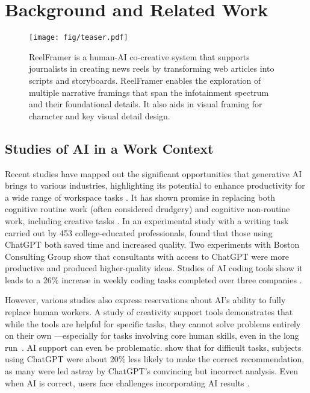 \section{Background and Related Work}

\begin{figure*}
\centering
\texttt{[image: fig/teaser.pdf]}
\caption{
ReelFramer is a human-AI co-creative system that supports journalists in creating news reels by transforming web articles into scripts and storyboards.
ReelFramer enables the exploration of multiple narrative framings that span the infotainment spectrum and their foundational details. 
It also aids in visual framing for character and key visual detail design.
}
\label{fig:teaser}
\end{figure*}

\subsection{Studies of AI in a Work Context}

Recent studies have mapped out the significant opportunities that generative AI brings to various industries, highlighting its potential to enhance productivity for a wide range of workspace tasks \cite{brynjolfsson2023generative, scienceproductivity}. 
It has shown promise in replacing both cognitive routine work (often considered drudgery) and cognitive non-routine work, including creative tasks \cite{bouschery2023augmenting}.
In an experimental study with a writing task carried out by 453 college-educated professionals, \citet{scienceproductivity} found that those using ChatGPT both saved time and increased quality.
Two experiments with Boston Consulting Group \cite{dell2023navigating} show that consultants with access to ChatGPT were more productive and produced higher-quality ideas.
Studies of AI coding tools show it leads to a 26\% increase in weekly coding tasks completed over three companies \cite{Cui_2024, peng2023impact}.

However, various studies also express reservations about AI's ability to fully replace human workers. 
A study of creativity support tools demonstrates that while the tools are helpful for specific tasks, they cannot solve problems entirely on their own \cite{tao2023ai}---especially for tasks involving core human skills, even in the long run~\cite{long2024novelty}. 
AI support can even be problematic. 
\citet{dell2023navigating} show that for difficult tasks, subjects using ChatGPT were about 20\% less likely to make the correct recommendation, as many were led astray by ChatGPT's convincing but incorrect analysis. 
Even when AI is correct, users face challenges incorporating AI results \cite{Kim2024}. 

